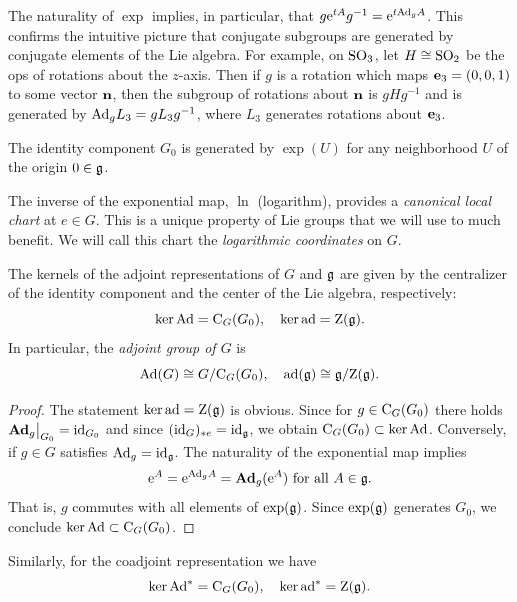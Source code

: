 \begin{rem}
    The naturality of $\exp$ implies, in particular, that $g\rme^{tA}g^{-1}=\rme^{t\Ad_g A}$. This confirms the intuitive picture that conjugate subgroups are generated by conjugate elements of the Lie algebra. For example, on $\SO_3$, let $H\cong\SO_2$ be the \gls{ops} of rotations about the $z$-axis. Then if $g$ is a rotation which maps $\bf{e}_3=(0,0,1)$ to some vector $\bf{n}$, then the subgroup of rotations about $\bf{n}$ is $gHg^{-1}$ and is generated by $\Ad_g L_3=gL_3 g^{-1}$, where $L_3$ generates rotations about $\bf{e}_3$.
\end{rem}
\begin{cor}
    The identity component $G_0$ is generated by $\exp(U)$ for any neighborhood $U$ of the origin $0\in\frakg$.
\end{cor}
 

\begin{rem}
    The inverse of the exponential map, $\ln$ (logarithm), provides a \emph{canonical local chart} at $e\in G$. This is a unique property of Lie groups that we will use to much benefit. We will call this chart the \emph{logarithmic coordinates} on $G$.
\end{rem}


\begin{prop}\label{prop 5.4.5 RS1 ker(Ad) and ker(ad)}
    The kernels of the adjoint representations of $G$ and $\frakg$ are given by the centralizer of the identity component and the center of the Lie algebra, respectively:
    \[\ker \Ad=\rmC_G(G_0),\quad \ker \ad=\rmZ(\frakg).\]
    In particular, the \emph{adjoint group of $G$} is 
    \[\Ad(G)\cong G\slash \rmC_G(G_0),\quad \ad(\frakg)\cong \frakg\slash \rmZ(\frakg).\]
\end{prop}
\begin{proof}
    The statement $\ker\ad=\rmZ(\frakg)$ is obvious. Since for $g\in \rmC_G(G_0)$ there holds $\restr{\Adg_g}{G_0}=\id_{G_0}$ and since $(\id_G)_{\ast e}=\id_\frakg$, we obtain $\rmC_G(G_0)\subset \ker\Ad$. Conversely, if $g\in G$ satisfies $\Ad_g=\id_\frakg$. The naturality of the exponential map implies 
    \[\rme^A=\rme^{\Ad_g A}=\Adg_g(\rme^A)\text{ for all }A\in\frakg.\]
    That is, $g$ commutes with all elements of $\exp(\frakg)$. Since $\exp(\frakg)$ generates $G_0$, we conclude $\ker\Ad\subset \rmC_G(G_0)$.
\end{proof}

Similarly, for the coadjoint representation we have
\[\ker \Ad^\ast=\rmC_G(G_0),\quad \ker\ad^\ast=\rmZ(\frakg).\]


